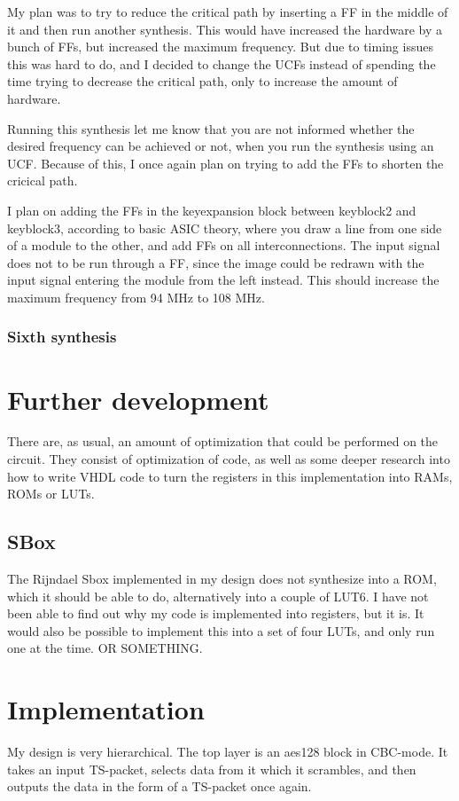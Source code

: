 My plan was to try to reduce the critical path by inserting a FF in the 
middle of it and then run another synthesis. This would have increased the 
hardware by a bunch of FFs, but increased the maximum frequency. But due 
to timing issues this was hard to do, and I decided to change the UCFs 
instead of spending the time trying to decrease the critical path, only to 
increase the amount of hardware.

Running this synthesis let me know that you are not informed whether the 
desired frequency can be achieved or not, when you run the synthesis using 
an UCF. Because of this, I once again plan on trying to add the FFs to 
shorten the cricical path. 

I plan on adding the FFs in the keyexpansion block between keyblock2 and 
keyblock3, according to basic ASIC theory, where you draw a line from one 
side of a module to the other, and add FFs on all interconnections. The 
input signal does not to be run through a FF, since the image could be 
redrawn with the input signal entering the module from the left instead. 
This should increase the maximum frequency from 94 MHz to 108 MHz.

\subsubsection{Sixth synthesis}


\section{Further development}
There are, as usual, an amount of optimization that could be performed 
on the circuit. They consist of optimization of code, as well as some 
deeper research into how to write VHDL code to turn the registers in 
this implementation into RAMs, ROMs or LUTs.

\subsection{SBox}
The Rijndael Sbox implemented in my design does not synthesize into a 
ROM, which it should be able to do, alternatively into a couple of LUT6.
I have not been able to find out why my code is implemented into 
registers, but it is. 
It would also be possible to implement this into a set of four LUTs, 
and only run one at the time. OR SOMETHING.

\section{Implementation}
My design is very hierarchical. The top layer is an aes128 block in 
CBC-mode. It takes an input TS-packet, selects data from it which it 
scrambles, and then outputs the data in the form of a TS-packet once 
again.

